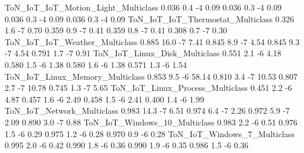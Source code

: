 ToN_IoT_IoT_Motion_Light_Multiclass                                   0.036                0.4           -4            0.09      0.036                   0.3              -4               0.09      0.036                   0.3              -4               0.09       0.036                    0.3               -4                0.09
ToN_IoT_IoT_Thermostat_Multiclass                                     0.326                1.6           -7            0.70      0.359                   0.9              -7               0.41      0.359                   0.8              -7               0.41       0.308                    0.7               -7                0.30
ToN_IoT_IoT_Weather_Multiclass                                        0.885               16.0           -7            7.41      0.845                   8.9              -7               4.54      0.845                   9.3              -7               4.54       0.791                    1.7               -7                0.91
ToN_IoT_Linux_Disk_Multiclass                                         0.551                2.1           -6            4.18      0.580                   1.5              -6               1.38      0.580                   1.6              -6               1.38       0.571                    1.3               -6                1.54
ToN_IoT_Linux_Memory_Multiclass                                       0.853                9.5           -6           58.14      0.810                   3.4              -7              10.53      0.807                   2.7              -7              10.78       0.745                    1.3               -7                5.65
ToN_IoT_Linux_Process_Multiclass                                      0.451                2.2           -6            4.87      0.457                   1.6              -6               2.49      0.458                   1.5              -6               2.41       0.400                    1.4               -6                1.99
ToN_IoT_Network_Multiclass                                            0.983               14.3           -7            6.51      0.974                   6.4              -7               2.26      0.972                   5.9              -7               2.09       0.890                    3.0               -7                0.88
ToN_IoT_Windows_10_Multiclass                                         0.983                2.2           -6            0.51      0.976                   1.5              -6               0.29      0.975                   1.2              -6               0.28       0.970                    0.9               -6                0.28
ToN_IoT_Windows_7_Multiclass                                          0.995                2.0           -6            0.42      0.990                   1.8              -6               0.36      0.990                   1.9              -6               0.35       0.986                    1.5               -6                0.36